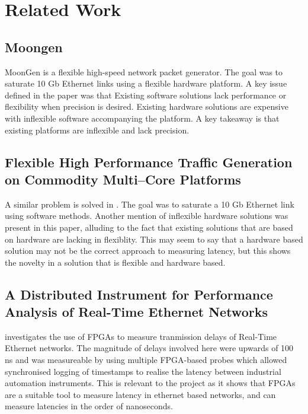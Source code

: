 \section{Related Work}

\subsection{Moongen}

\par MoonGen \cite{moongen} is a flexible high-speed network packet generator. The goal was to saturate 10 Gb Ethernet links using 
a flexible hardware platform. A key issue defined in the paper was that Existing software solutions lack performance
or flexibility when precision is desired. Existing hardware solutions are expensive with inflexible software accompanying
the platform. A key takeaway is that existing platforms are inflexible and lack precision.

\subsection{Flexible High Performance Traffic Generation on Commodity Multi–Core Platforms}

\par A similar problem is solved in \cite{multicore}. The goal was to saturate a 10 Gb Ethernet link using software methods.
Another mention of inflexible hardware solutions was present in this paper, alluding to the fact that existing
solutions that are based on hardware are lacking in flexiblity. This may seem to say that a hardware based solution may
not be the correct approach to measuring latency, but this shows the novelty in a solution that is flexible
and hardware based.

\subsection{A Distributed Instrument for Performance Analysis of Real-Time Ethernet Networks}

\cite{realtime} investigates the use of FPGAs to measure tranmission delays of Real-Time Ethernet networks. The magnitude
of delays involved here were upwards of 100 ns and was measureable by using multiple FPGA-based probes which allowed 
synchronised logging of timestamps to realise the latency between industrial automation instruments. This is relevant
to the project as it shows that FPGAs are a suitable tool to measure latency in ethernet based networks, and can
measure latencies in the order of nanoseconds.


